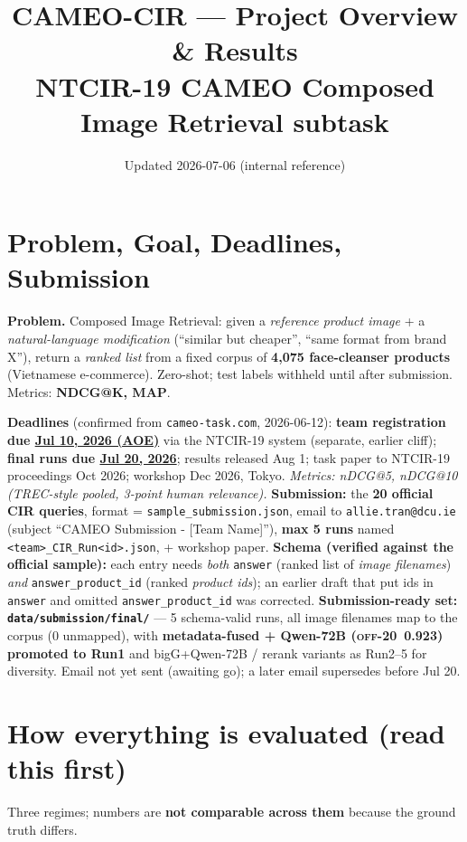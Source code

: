 \documentclass[10pt]{article}
\title{\vspace{-3em}\textbf{CAMEO-CIR --- Project Overview \& Results}\\[-0.2em]
\large NTCIR-19 CAMEO Composed Image Retrieval subtask}
\author{}\date{Updated 2026-07-06 \quad (internal reference)}
\newcommand{\off}{\textsc{off-20}}
\begin{document}
\maketitle
\vspace{-3.5em}

\section{Problem, Goal, Deadlines, Submission}
\textbf{Problem.} Composed Image Retrieval: given a \emph{reference product image} + a
\emph{natural-language modification} (``similar but cheaper'', ``same format from brand X''),
return a \emph{ranked list} from a fixed corpus of \textbf{4{,}075 face-cleanser products}
(Vietnamese e-commerce). Zero-shot; test labels withheld until after submission. Metrics: \textbf{NDCG@K, MAP}.

\textbf{Deadlines} (confirmed from \texttt{cameo-task.com}, 2026-06-12): \textbf{team registration due
\underline{Jul 10, 2026 (AOE)}} via the NTCIR-19 system (separate, earlier cliff); \textbf{final runs due
\underline{Jul 20, 2026}}; results released Aug 1; task paper to NTCIR-19 proceedings Oct 2026; workshop
Dec 2026, Tokyo. \emph{Metrics: nDCG@5, nDCG@10 (TREC-style pooled, 3-point human relevance).}
\textbf{Submission:} the \textbf{20 official CIR queries}, format = \texttt{sample\_submission.json}, email to
\texttt{allie.tran@dcu.ie} (subject ``CAMEO Submission - [Team Name]''), \textbf{max 5 runs} named
\texttt{<team>\_CIR\_Run<id>.json}, + workshop paper. \textbf{Schema (verified against the official sample):}
each entry needs \emph{both} \texttt{answer} (ranked list of \emph{image filenames}) \emph{and}
\texttt{answer\_product\_id} (ranked \emph{product ids}); an earlier draft that put ids in \texttt{answer} and
omitted \texttt{answer\_product\_id} was corrected. \textbf{Submission-ready set: \texttt{data/submission/final/}}
--- 5 schema-valid runs, all image filenames map to the corpus (0 unmapped), with \textbf{metadata-fused +
Qwen-72B (\off\ 0.923) promoted to Run1} and bigG+Qwen-72B / rerank variants as Run2--5 for diversity.
Email not yet sent (awaiting go); a later email supersedes before Jul 20.

\section{How everything is evaluated (read this first)}
Three regimes; numbers are \textbf{not comparable across them} because the ground truth differs.
\end{document}
